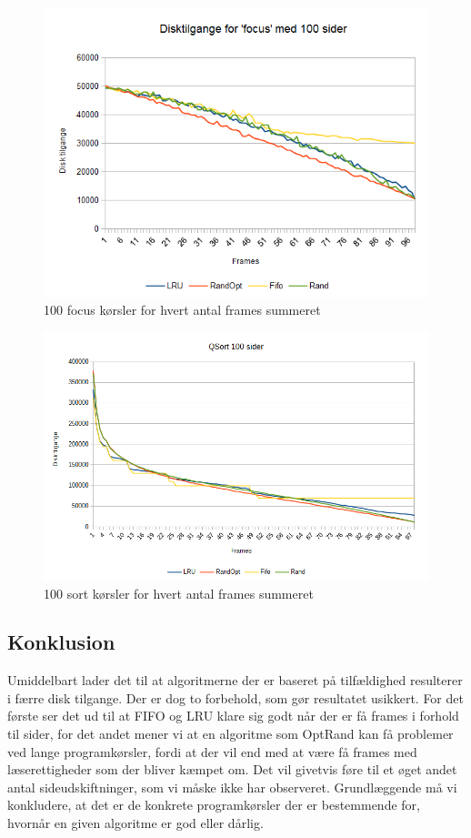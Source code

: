 \begin{figure}[ht]
\centerline{\includegraphics[scale=0.8]{graph/stat_focus}}
\caption{100 focus kørsler for hvert antal frames summeret}
\label{fig:focus}
\end{figure}

\begin{figure}[ht]
\centerline{\includegraphics[scale=0.8]{graph/stat_sort}}
\caption{100 sort kørsler for hvert antal frames summeret}
\label{fig:sort}
\end{figure}

\subsection{Konklusion}
Umiddelbart lader det til at algoritmerne der er baseret på tilfældighed resulterer i færre disk tilgange. Der er dog to forbehold, som gør resultatet usikkert. For det første ser det ud til at FIFO og LRU klare sig godt når der er få frames i forhold til sider, for det andet mener vi at en algoritme som OptRand kan få problemer ved lange programkørsler, fordi at der vil end med at være få frames med læserettigheder som der bliver kæmpet om. Det vil givetvis føre til et øget andet antal sideudskiftninger, som vi måske ikke har observeret. Grundlæggende må vi konkludere, at det er de konkrete programkørsler der er bestemmende for, hvornår en given algoritme er god eller dårlig. 
